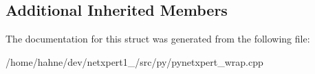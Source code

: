 \subsection*{Additional Inherited Members}


The documentation for this struct was generated from the following file\+:\begin{DoxyCompactItemize}
\item 
/home/hahne/dev/netxpert1\+\_/src/py/pynetxpert\+\_\+wrap.\+cpp\end{DoxyCompactItemize}
